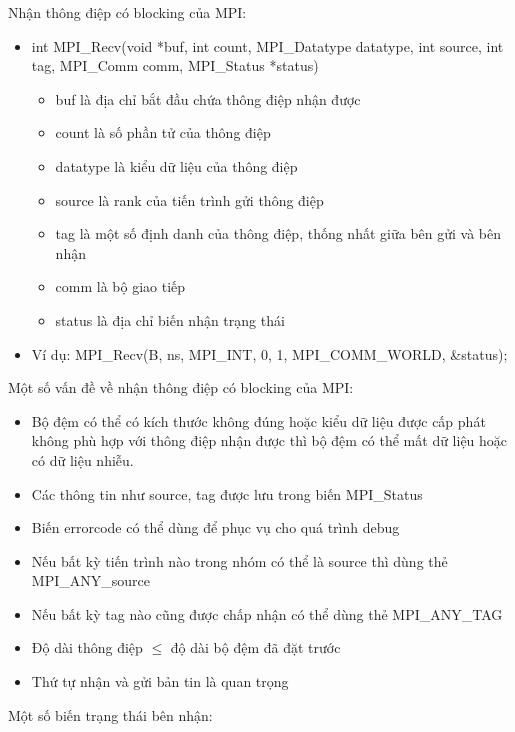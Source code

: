 \documentclass[14pt, a4paper]{article}
\numberwithin{equation}{section}
\numberwithin{figure}{section}
\numberwithin{dl}{section}
\numberwithin{md}{section}
\numberwithin{bd}{section}
\numberwithin{dn}{section}
\numberwithin{hq}{section}
\begin{document}
Nhận thông điệp có blocking của MPI:

\begin{itemize}
    \item int MPI\_Recv(void *buf, int count, MPI\_Datatype datatype,
                        int source, int tag, MPI\_Comm comm,
                        MPI\_Status *status)
    \begin{itemize}
        \item buf là địa chỉ bắt đầu chứa thông điệp nhận được
        \item count là số phần tử của thông điệp
        \item datatype là kiểu dữ liệu của thông điệp
        \item source là rank của tiến trình gửi thông điệp
        \item tag là một số định danh của thông điệp, thống nhất giữa bên gửi và bên nhận
        \item comm là bộ giao tiếp
        \item status là địa chỉ biến nhận trạng thái
    \end{itemize}
    \item Ví dụ: MPI\_Recv(B, ns, MPI\_INT, 0, 1, MPI\_COMM\_WORLD, \&status);
\end{itemize}

Một số vấn đề về nhận thông điệp có blocking của MPI:

\begin{itemize}
    \item Bộ đệm có thể có kích thước không đúng hoặc kiểu dữ liệu được cấp phát không phù hợp với thông điệp nhận được thì bộ đệm có thể mất dữ liệu hoặc có dữ liệu nhiễu.
    \item Các thông tin như source, tag được lưu trong biến MPI\_Status
    \item Biến errorcode có thể dùng để phục vụ cho quá trình debug
    \item Nếu bất kỳ tiến trình nào trong nhóm có thể là source thì dùng thẻ MPI\_ANY\_source
    \item Nếu bất kỳ tag nào cũng được chấp nhận có thể dùng thẻ MPI\_ANY\_TAG
    \item Độ dài thông điệp $\leq$ độ dài bộ đệm đã đặt trước
    \item Thứ tự nhận và gửi bản tin là quan trọng
\end{itemize}

Một số biến trạng thái bên nhận:
\end{document}
